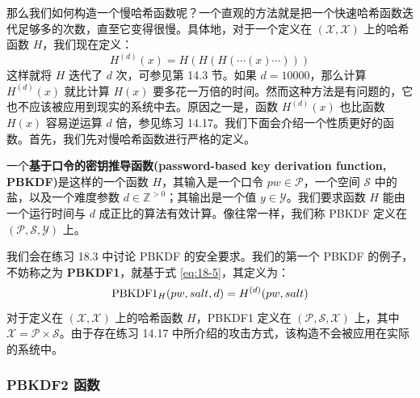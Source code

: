 那么我们如何构造一个慢哈希函数呢？一个直观的方法就是把一个快速哈希函数迭代足够多的次数，直至它变得很慢。具体地，对于一个定义在 $(\mathcal{X},\mathcal{X})$ 上的哈希函数 $H$，我们现在定义：
\begin{equation}\label{eq:18-5}
	H^{(d)}(x)=H(H(H(\cdots(x)\cdots)))
\end{equation}
这样就将 $H$ 迭代了 $d$ 次，可参见第 14.3 节。如果 $d=10000$，那么计算 $H^{(d)}(x)$ 就比计算 $H(x)$ 要多花一万倍的时间。然而这种方法是有问题的，它也不应该被应用到现实的系统中去。原因之一是，函数 $H^{(d)}(x)$ 也比函数 $H(x)$ 容易逆运算 $d$ 倍，参见练习 14.17。我们下面会介绍一个性质更好的函数。首先，我们先对慢哈希函数进行严格的定义。

\begin{definition}
	一个\textbf{基于口令的密钥推导函数(password-based key derivation function, PBKDF)}是这样的一个函数 $H$，其输入是一个口令 $pw\in\mathcal{P}$，一个空间 $\mathcal{S}$ 中的盐，以及一个难度参数 $d\in\mathbb{Z}^{>0}$；其输出是一个值 $y\in\mathcal{Y}$。我们要求函数 $H$ 能由一个运行时间与 $d$ 成正比的算法有效计算。像往常一样，我们称 PBKDF 定义在 $(\mathcal{P},\mathcal{S},\mathcal{Y})$ 上。
\end{definition}

我们会在练习 18.3 中讨论 PBKDF 的安全要求。我们的第一个 PBKDF 的例子，不妨称之为 \textbf{PBKDF1}，就基于式 \ref{eq:18-5}，其定义为：
$$
{\rm PBKDF1}_H(pw,salt,d)=H^{(d)}(pw,salt)
$$
对于定义在 $(\mathcal{X},\mathcal{X})$ 上的哈希函数 $H$，PBKDF1 定义在 $(\mathcal{P},\mathcal{S},\mathcal{X})$ 上，其中 $\mathcal{X}=\mathcal{P}\times\mathcal{S}$。由于存在练习 14.17 中所介绍的攻击方式，该构造不会被应用在实际的系统中。

\subsubsection{PBKDF2 函数}

